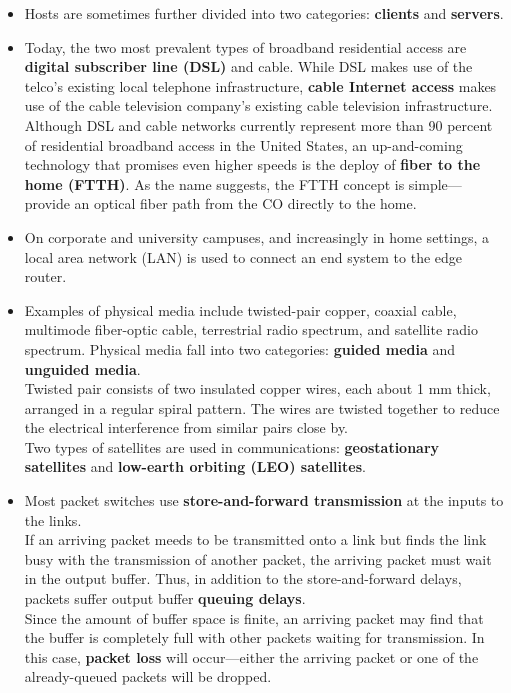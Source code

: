 \begin{itemize}
\item
Hosts are sometimes further divided into two categories: \textbf{clients} and \textbf{servers}.

\item
Today, the two most prevalent types of broadband residential access are \textbf{digital subscriber line (DSL)} and cable. While DSL makes use of the telco's existing local telephone infrastructure, \textbf{cable Internet access} makes use of the cable television company's existing cable television infrastructure.\\
Although DSL and cable networks currently represent more than 90 percent of residential broadband access in the United States, an up-and-coming technology that promises even higher speeds is the deploy of \textbf{fiber to the home (FTTH)}. As the name suggests, the FTTH concept is simple---provide an optical fiber path from the CO directly to the home.

\item
On corporate and university campuses, and increasingly in home settings, a local area network (LAN) is used to connect an end system to the edge router.

\item
Examples of physical media include twisted-pair copper, coaxial cable, multimode fiber-optic cable, terrestrial radio spectrum, and satellite radio spectrum. Physical media fall into two categories: \textbf{guided media} and \textbf{unguided media}.\\
Twisted pair consists of two insulated copper wires, each about 1 mm thick, arranged in a regular spiral pattern. The wires are twisted together to reduce the electrical interference from similar pairs close by.\\
Two types of satellites are used in communications: \textbf{geostationary satellites} and \textbf{low-earth orbiting (LEO) satellites}.

\item
Most packet switches use \textbf{store-and-forward transmission} at the inputs to the links.\\
If an arriving packet meeds to be transmitted onto a link but finds the link busy with the transmission of another packet, the arriving packet must wait in the output buffer. Thus, in addition to the store-and-forward delays, packets suffer output buffer \textbf{queuing delays}.\\
Since the amount of buffer space is finite, an arriving packet may find that the buffer is completely full with other packets waiting for transmission. In this case, \textbf{packet loss} will occur---either the arriving packet or one of the already-queued packets will be dropped.


\end{itemize}
